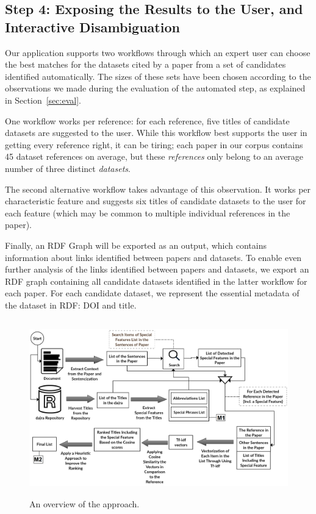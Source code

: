 \documentclass{IOS-Book-Article}
\begin{document}
\subsection{Step 4: Exposing the Results to the User, and Interactive Disambiguation}
\label{sec:expos-results-reus}	
Our application supports two workflows through which an expert user can choose the best matches for the datasets cited by a paper from a set of candidates identified automatically. The sizes of these sets have been chosen according to the observations we made during the evaluation of the automated step, as explained in Section~\ref{sec:eval}.

One workflow works per reference: for each reference, five titles of candidate datasets are suggested to the user. While this workflow best supports the user in getting every reference right, it can be tiring; each paper in our corpus contains 45 dataset references on average, but these \emph{references} only belong to an average number of three distinct \emph{datasets}.

The second alternative workflow takes advantage of this observation. It works per characteristic feature and suggests six titles of candidate datasets to the user for each feature (which may be common to multiple individual references in the paper). 

Finally, an RDF Graph will be exported as an output, which contains information about links identified between papers and datasets. To enable even further analysis of the links identified between papers and datasets, we export an RDF graph containing all candidate datasets identified in the latter workflow for each paper. For each candidate dataset, we represent the essential metadata of the dataset in RDF: DOI and title.

\begin{figure}[h]
	\centering
	\includegraphics[height=3in]{Overwveiw_System.png}
	\caption{An overview of the approach.}
	\label{fig:Overview_of_approach}
\end{figure}
\end{document}
